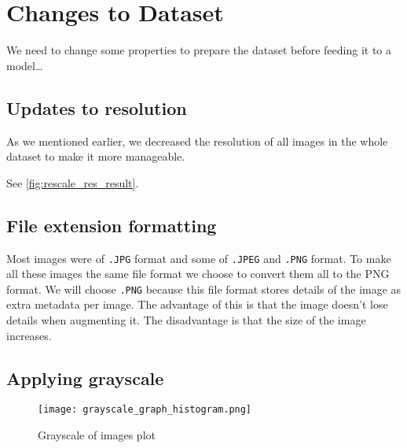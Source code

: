 
\section{Changes to Dataset} %
\begin{fullwidth}We need to change some properties to prepare the dataset before feeding it to a model\dots\end{fullwidth}

\subsection{Updates to resolution}
\begin{fullwidth}As we mentioned earlier, we decreased the resolution of all images in the whole dataset to make it more manageable. \end{fullwidth}
See \ref{fig:rescale_res_result}.

\subsection{File extension formatting}
\begin{fullwidth}
Most images were of \verb|.JPG| format and some of \verb|.JPEG| and \verb|.PNG| format. 
To make all these images the same file format we choose to convert them all to the PNG format. 
We will choose \verb|.PNG| because this file format stores details of the image as extra metadata per image. 
The advantage of this is that the image doesn't lose details when augmenting it. 
The disadvantage is that the size of the image increases.
\end{fullwidth}

\subsection{Applying grayscale}
\begin{figure}[H] %
	\texttt{[image: grayscale\_graph\_histogram.png]}
	\caption{Grayscale of images plot}
	\label{fig:grayscale_graph_histogram} %
\end{figure}

